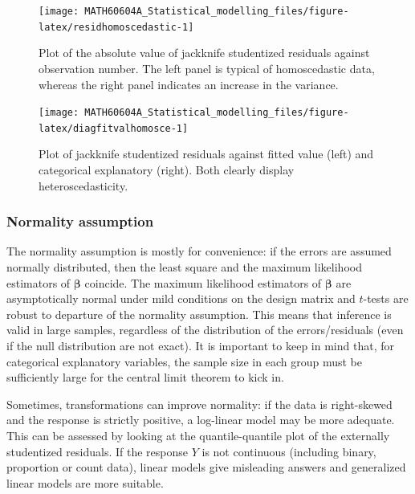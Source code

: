 \documentclass[
  11pt,
  letterpaper,
]{book}
\theoremstyle{definition}
\theoremstyle{definition}
\theoremstyle{definition}
\theoremstyle{remark}
\begin{document}
\begin{figure}

{\centering \texttt{[image: MATH60604A\_Statistical\_modelling\_files/figure-latex/residhomoscedastic-1]} 

}

\caption{Plot of the absolute value of jackknife studentized residuals against observation number. The left panel is typical of homoscedastic data, whereas the right panel indicates an increase in the variance.}\label{fig:residhomoscedastic}
\end{figure}

\begin{figure}

{\centering \texttt{[image: MATH60604A\_Statistical\_modelling\_files/figure-latex/diagfitvalhomosce-1]} 

}

\caption{Plot of jackknife studentized residuals against fitted value (left) and categorical explanatory (right). Both clearly display heteroscedasticity.}\label{fig:diagfitvalhomosce}
\end{figure}

\hypertarget{normality-assumption}{%
\subsubsection{Normality assumption}\label{normality-assumption}}

The normality assumption is mostly for convenience: if the errors are assumed normally distributed, then the least square and the maximum likelihood estimators of \(\boldsymbol{\beta}\) coincide.
The maximum likelihood estimators of \(\boldsymbol{\beta}\) are asymptotically normal under mild conditions on the design matrix and \(t\)-tests are robust to departure of the normality assumption. This means that inference is valid in large samples, regardless of the distribution of the errors/residuals (even if the null distribution are not exact). It is important to keep in mind that, for categorical explanatory variables, the sample size in each group must be sufficiently large for the central limit theorem to kick in.

Sometimes, transformations can improve normality: if the data is right-skewed and the response is strictly positive, a log-linear model may be more adequate. This can be assessed by looking at the quantile-quantile plot of the externally studentized residuals. If the response \(Y\) is not continuous (including binary, proportion or count data), linear models give misleading answers and generalized linear models are more suitable.
\end{document}
